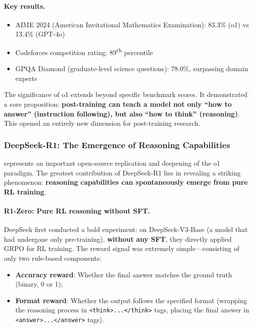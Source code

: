 \paragraph{Key results.}
\begin{itemize}[leftmargin=2em]
  \item AIME 2024 (American Invitational Mathematics Examination): 83.3\% (o1) vs 13.4\% (GPT-4o)
  \item Codeforces competition rating: 89\textsuperscript{th} percentile
  \item GPQA Diamond (graduate-level science questions): 78.0\%, surpassing domain experts
\end{itemize}

\noindent
The significance of o1 extends beyond specific benchmark scores.
It demonstrated a core proposition:
\textbf{post-training can teach a model not only ``how to answer'' (instruction following),
but also ``how to think'' (reasoning)}.
This opened an entirely new dimension for post-training research.

\subsubsection{DeepSeek-R1: The Emergence of Reasoning Capabilities}
\label{sec:t4-r1}

 represents an important open-source replication and deepening of the o1 paradigm.
The greatest contribution of DeepSeek-R1 lies in revealing a striking phenomenon:
\textbf{reasoning capabilities can spontaneously emerge from pure RL training}.

\paragraph{R1-Zero: Pure RL reasoning without SFT.}
DeepSeek first conducted a bold experiment:
on DeepSeek-V3-Base (a model that had undergone only pre-training),
\textbf{without any SFT}, they directly applied GRPO for RL training.
The reward signal was extremely simple---consisting of only two rule-based components:
\begin{itemize}[leftmargin=2em]
  \item \textbf{Accuracy reward}: Whether the final answer matches the ground truth (binary, 0 or 1);
  \item \textbf{Format reward}: Whether the output follows the specified format
    (wrapping the reasoning process in \texttt{<think>...</think>} tags,
    placing the final answer in \texttt{<answer>...</answer>} tags).
\end{itemize}

